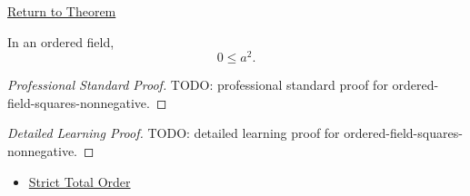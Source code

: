 \newpage
{}
\label{prf:ordered-field-squares-nonnegative}

\begin{remark*}[Return]
\hyperref[prop:product-of-positives-is-positive-q]{Return to Theorem}
\end{remark*}

\begin{theorem*}
In an ordered field,
\[
0\le a^2.
\]
\end{theorem*}

\begin{proof}[Professional Standard Proof]
\LRAProofBodyStart
TODO: professional standard proof for ordered-field-squares-nonnegative.
\end{proof}

\begin{proof}[Detailed Learning Proof]
\LRAProofBodyStart
TODO: detailed learning proof for ordered-field-squares-nonnegative.
\end{proof}

\begin{remark*}
\end{remark*}

\begin{dependencies}
\begin{itemize}
  \item \hyperref[def:strict-total-order]{Strict Total Order}
\end{itemize}
\end{dependencies}

\clearpage
